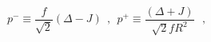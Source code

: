 \begin{equation}
p^-\equiv \frac{f}{\sqrt{2}}(\Delta-J)~~,~~p^+\equiv \frac{(\Delta+J)}{\sqrt{2}f R^2} ~~~,
\label{momenta}
\end{equation} 
